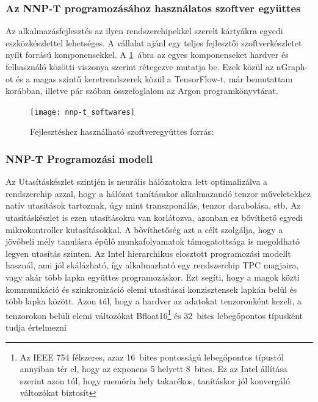 \subsubsection{Az NNP-T programozásához használatos szoftver együttes}
Az alkalmazásfejlesztés az ilyen rendszerchipekkel szerelt kártyákra egyedi eszközkészlettel lehetséges. A vállalat ajánl egy teljes fejlesztői szoftverkészletet nyílt forrású komponensekkel. A \ref{fig:nnp-tSwStack}~ábra az egyes komponenseket hardver és felhasználó közötti viszonya szerint rétegezve mutatja be. Ezek közül az nGraph-ot és a magas szintű keretrendszerek közül a TensorFlow-t, már bemutattam korábban, illetve pár szóban összefoglalom az Argon programkönyvtárat.
\begin{figure}[H]
	\centering
	\texttt{[image: nnp-t\_softwares]}
	\caption[Szoftverek]{Fejlesztéshez használható szoftveregyüttes \footnotesize forrás:\cite{yang-nnpt}}
	\label{fig:nnp-tSwStack}
\end{figure}

\subsubsection{NNP-T Programozási modell}
Az Utasításkészlet szintjén is neurális hálózatokra lett optimalizálva a rendszerchip azzal, hogy a hálózat tanításakor alkalmazandó tenzor műveletekhez natív utasítások tartoznak, úgy mint transzponálás, tenzor darabolása, stb. Az utasításkészlet is ezen utasításokra van korlátozva, azonban ez bővíthető egyedi mikrokontroller kutasításokkal. A bővíthetőség azt a célt szolgálja, hogy a jövőbeli mély tanulásra épülő munkafolyamatok támogatottsága is megoldható legyen utasítás szinten. 
Az Intel hierarchikus elosztott programozási modellt használ, ami jól skálázható, így alkalmazható egy rendszerchip TPC magjaira, vagy akár több lapka együttes programozáskor. Ezt segíti, hogy a magok közti kommunikáció és szinkronizáció elemi utasításai konzisztensek lapkán belül és több lapka között.
Azon túl, hogy a hardver az adatokat tenzoronként kezeli, a tenzorokon belüli elemi változókat Bfloat16\footnote{Az IEEE 754 félszeres, azaz 16~bites pontosságú lebegőpontos típustól annyiban tér el, hogy az exponens 5 helyett 8~bites. Ez az Intel állítása szerint azon túl, hogy memória hely takarékos, tanításkor jól konvergáló változókat biztosít} és 32~bites lebegőpontos típusként tudja értelmezni

